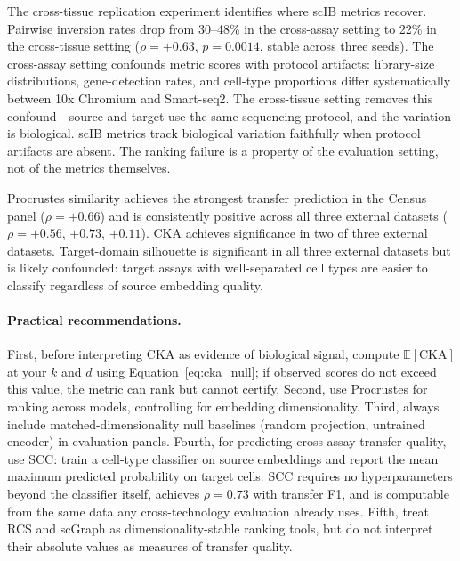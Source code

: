 \documentclass[11pt]{article}
\begin{document}
The cross-tissue replication experiment identifies where scIB metrics
recover. Pairwise inversion rates drop from 30--48\% in the cross-assay
setting to 22\% in the cross-tissue setting ($\rho = +0.63$,
$p = 0.0014$, stable across three seeds). The cross-assay setting
confounds metric scores with protocol artifacts: library-size
distributions, gene-detection rates, and cell-type proportions differ
systematically between 10x Chromium and Smart-seq2. The cross-tissue
setting removes this confound---source and target use the same
sequencing protocol, and the variation is biological. scIB metrics track
biological variation faithfully when protocol artifacts are absent. The
ranking failure is a property of the evaluation setting, not of the
metrics themselves.

Procrustes similarity achieves the strongest transfer prediction in the
Census panel ($\rho = +0.66$) and is consistently positive across all
three external datasets ($\rho = +0.56$, $+0.73$, $+0.11$). CKA
achieves significance in two of three external datasets. Target-domain
silhouette is significant in all three external datasets but is likely
confounded: target assays with well-separated cell types are easier to
classify regardless of source embedding quality.

\paragraph{Practical recommendations.} First, before interpreting CKA as
evidence of biological signal, compute $\mathbb{E}[\mathrm{CKA}]$ at
your $k$ and $d$ using Equation~\ref{eq:cka_null}; if observed scores do
not exceed this value, the metric can rank but cannot certify. Second,
use Procrustes for ranking across models, controlling for
embedding dimensionality. Third, always include matched-dimensionality
null baselines (random projection, untrained encoder) in evaluation
panels. Fourth, for predicting cross-assay transfer quality, use SCC:
train a cell-type classifier on source embeddings and report the mean
maximum predicted probability on target cells. SCC requires no
hyperparameters beyond the classifier itself, achieves $\rho = 0.73$
with transfer F1, and is computable from the same data any
cross-technology evaluation already uses. Fifth, treat RCS and scGraph
as dimensionality-stable ranking tools, but do not interpret their
absolute values as measures of transfer quality.
\end{document}
